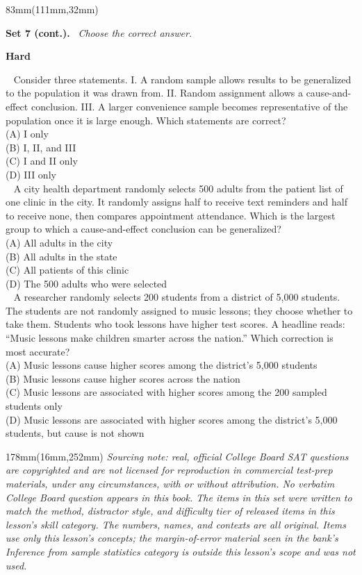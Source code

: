 \documentclass[a4paper]{article}
\newcommand{\RCOL}{111mm}
\newcommand{\COLW}{83mm}
\newcommand{\setkicker}[2]{%
{\sffamily\bfseries\fontsize{12}{14}\selectfont #1.}\ {\itshape\fontsize{11}{14}\selectfont\color{black!75} #2}\par\vspace{2mm}%
}
\newcommand{\pnum}[1]{\fcolorbox{ink}{white}{\sffamily\bfseries\fontsize{8}{8}\selectfont #1}~}
\newcommand{\satqw}[6]{%
\noindent\pnum{#1} #2\\[2mm]
\hspace*{7mm}(A) #3\\[1.6mm]
\hspace*{7mm}(B) #4\\[1.6mm]
\hspace*{7mm}(C) #5\\[1.6mm]
\hspace*{7mm}(D) #6\\[7mm]%
}
\begin{document}
\begin{textblock*}{\COLW}(\RCOL,32mm)
{\fontsize{10.3}{13}\selectfont
\setkicker{Set 7 (cont.)}{Choose the correct answer.}
{\sffamily\bfseries\color{accent}\fontsize{10.5}{12}\selectfont Hard}\par\vspace{1.5mm}
\satqw{13}{Consider three statements. I. A random sample allows results to be generalized to the population it was drawn from. II. Random assignment allows a cause-and-effect conclusion. III. A larger convenience sample becomes representative of the population once it is large enough. Which statements are correct?}{I only}{I, II, and III}{I and II only}{III only}
\satqw{14}{A city health department randomly selects 500 adults from the patient list of one clinic in the city. It randomly assigns half to receive text reminders and half to receive none, then compares appointment attendance. Which is the largest group to which a cause-and-effect conclusion can be generalized?}{All adults in the city}{All adults in the state}{All patients of this clinic}{The 500 adults who were selected}
\satqw{15}{A researcher randomly selects 200 students from a district of 5,000 students. The students are not randomly assigned to music lessons; they choose whether to take them. Students who took lessons have higher test scores. A headline reads: ``Music lessons make children smarter across the nation.'' Which correction is most accurate?}{Music lessons cause higher scores among the district's 5,000 students}{Music lessons cause higher scores across the nation}{Music lessons are associated with higher scores among the 200 sampled students only}{Music lessons are associated with higher scores among the district's 5,000 students, but cause is not shown}
}
\end{textblock*}
\begin{textblock*}{178mm}(16mm,252mm)
{\itshape\fontsize{8}{10}\selectfont\color{black!75} Sourcing note: real, official College Board SAT questions are copyrighted and are not licensed for reproduction in commercial test-prep materials, under any circumstances, with or without attribution. No verbatim College Board question appears in this book. The items in this set were written to match the \textit{method}, \textit{distractor style}, and \textit{difficulty tier} of released items in this lesson's skill category. The numbers, names, and contexts are all original. Items use only this lesson's concepts; the margin-of-error material seen in the bank's \textit{Inference from sample statistics} category is outside this lesson's scope and was not used.}
\end{textblock*}
\clearpage
\end{document}

